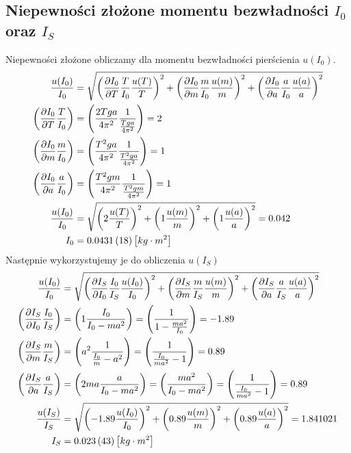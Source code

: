 \documentclass{fizraport}
\begin{document}
\subsection{Niepewności złożone momentu bezwładności $I_0$ oraz $I_S$}
Niepewności złożone obliczamy dla momentu bezwładności pierścienia $u(I_0)$. %
\begin{align*}
    \frac{u(I_0)}{I_0} &=\sqrt{
    \left( \frac{ \partial I_0 }{ \partial T} \frac{T}{I_0} \frac{u(T)}{T}\right)^2+
    \left( \frac{ \partial I_0 }{ \partial m} \frac{m}{I_0} \frac{u(m)}{m}\right)^2+
    \left( \frac{ \partial I_0 }{ \partial a} \frac{a}{I_0} \frac{u(a)}{a}\right)^2
    }\\
    \left( \frac{ \partial I_0 }{ \partial T} \frac{T}{I_0}\right) &=
    \left( \frac{2Tga}{4\pi^2}  \frac{1}{\frac{Tga}{4\pi^2}}\right) = 2\\
    \left( \frac{ \partial I_0 }{ \partial m} \frac{m}{I_0}\right) &=
    \left( \frac{T^2ga}{4\pi^2}  \frac{1}{\frac{T^2ga}{4\pi^2}}\right) = 1\\
    \left( \frac{ \partial I_0 }{ \partial a} \frac{a}{I_0}\right) &=
    \left( \frac{T^2gm}{4\pi^2}  \frac{1}{\frac{T^2gm}{4\pi^2}}\right) = 1\\
    \frac{u(I_0)}{I_0} &=\sqrt{
    \left( 2 \frac{u(T)}{T}\right)^2+
    \left( 1 \frac{u(m)}{m}\right)^2+
    \left( 1 \frac{u(a)}{a}\right)^2
    }=0.042\\ %
    I_0&=\uncertain{0.0431}{18}\left[kg\cdot m^2\right]
\end{align*}
Następnie wykorzystujemy je do obliczenia $u(I_S)$
\begin{align*}
    \frac{u(I_0)}{I_0} &=\sqrt{
    \left( \frac{ \partial I_S }{ \partial I_0} \frac{I_0}{I_S} \frac{u(I_0)}{I_0}\right)^2+
    \left( \frac{ \partial I_S }{ \partial m} \frac{m}{I_S} \frac{u(m)}{m}\right)^2+
    \left( \frac{ \partial I_S }{ \partial a} \frac{a}{I_S} \frac{u(a)}{a}\right)^2
    }\\
    \left( \frac{ \partial I_S }{ \partial I_0} \frac{I_0}{I_S}\right) &=
    \left( 1  \frac{I_0}{I_0-ma^2}\right) = 
    \left( \frac{1}{1-\frac{ma^2}{I_0}}\right)=-1.89\\%
    \left( \frac{ \partial I_S }{ \partial m} \frac{m}{I_S}\right) &=
    \left( a^2  \frac{1}{\frac{I_0}{m}-a^2} \right) = 
    \left(  \frac{1}{\frac{I_0}{ma^2}-1} \right) =0.89\\%
    \left( \frac{ \partial I_S }{ \partial a} \frac{a}{I_S}\right) &=
    \left( 2ma  \frac{a}{I_0-ma^2}\right) =
    \left(\frac{ma^2}{I_0-ma^2}\right)=
    \left(\frac{1}{\frac{I_0}{ma^2}-1}\right)=0.89\\%
    \frac{u(I_S)}{I_S} &=\sqrt{
    \left( -1.89 \frac{u(I_0)}{I_0}\right)^2+
    \left( 0.89 \frac{u(m)}{m}\right)^2+
    \left( 0.89 \frac{u(a)}{a}\right)^2
    }=1.841021\\
I_S&=\uncertain{0.023}{43}\left[kg\cdot m^2\right]
\end{align*}
\end{document}
